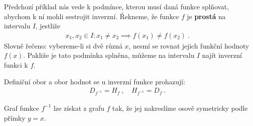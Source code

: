 Předchozí příklad nás vede k podmínce, kterou musí daná funkce splňovat, abychom k ní mohli sestrojit inverzní. Řekneme, že funkce $f$ je \textbf{prostá} na intervalu $I$, jestliže \begin{align}
    x_1, x_2 \in I : x_1 \neq x_2 \implies f(x_1) \neq f(x_2) \:.
\end{align}
Slovně řečeno: vybereme-li si dvě různá $x$, nesmí se rovnat jejich funkční hodnoty $f(x)$. Pakliže je tato podmínka splněna, můžeme na intervalu $I$ najít inverzní funkci k $f$.

Definiční obor a obor hodnot se u inverzní funkce prohazují: \begin{align}
    D_{f^{-1}} = H_f \:, \quad H_{f^{-1}} = D_f \:.
\end{align}

Graf funkce $f^{-1}$ lze získat z grafu $f$ tak, že jej nakreslíme osově symetricky podle přímky $y=x$.


